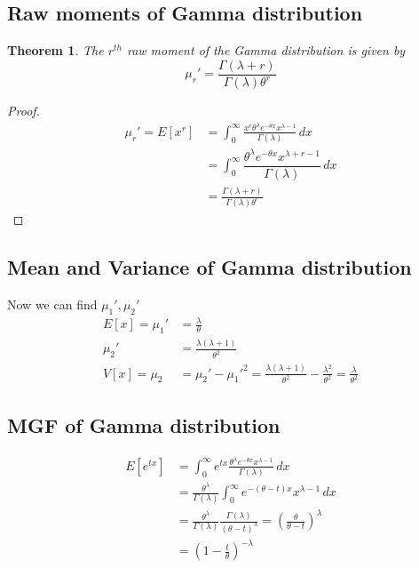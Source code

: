 \documentclass[oneside,11pt,pdftex]{book}%
\numberwithin{equation}{section}
\newtheorem{theorem}{Theorem}[chapter]%
\numberwithin{section}{chapter}
\numberwithin{equation}{chapter}
\begin{document}
\subsection{Raw moments of Gamma distribution}
\begin{theorem}
	The $ r^{th} $ raw moment of the Gamma distribution is given by \[\mu_r'=\frac{\Gamma(\lambda+r)}{\Gamma(\lambda)\theta^r} \]
\end{theorem}
\begin{proof}
	\begin{align*}
		\mu_r'=E[x^r]&=\int_0^\infty \frac{x^r \theta^\lambda e^{-\theta x} x^{\lambda -1}}{\Gamma(\lambda)}\, dx\\
		&=\int_0^{\infty} \dfrac{\theta^{\lambda} e^{-\theta x}x^{\lambda+r-1}  }{\Gamma(\lambda)}\, dx\\
		&= \frac{\Gamma(\lambda+r)}{\Gamma(\lambda) \theta^r}
	\end{align*}
\end{proof}

\subsection{Mean and Variance of Gamma distribution}
Now we can find $ \mu_1', \mu_2' $
\begin{align*}
	E[x]= \mu_1'&=\frac{\lambda}{\theta}\\
	\mu_2'&= \frac{\lambda(\lambda+1)}{\theta^2}\\
	V[x] = \mu_2 &=\mu_2'-\mu_1'^2=\frac{\lambda(\lambda +1)}{\theta^2}-\frac{\lambda^2}{\theta^2}=\frac{\lambda}{\theta^2}
\end{align*}

\subsection{MGF of Gamma distribution}
\begin{align*}
	 E[e^{tx}]&=\int_0^{\infty} e^{tx} \frac{\theta^\lambda e^{-\theta x} x^{\lambda -1}}{\Gamma(\lambda )}\, dx\\
	 &= \frac{\theta^{\lambda}}{\Gamma (\lambda)} \int_0^{\infty} e^{-(\theta - t) x}x^{\lambda -1}\, dx\\
	 &= \frac{\theta^\lambda}{\Gamma(\lambda )} \frac{\Gamma(\lambda )}{(\theta -t )^{\lambda}}=\left( \frac{\theta}{\theta - t}\right)^\lambda\\
	 &=\left(1- \frac{t}{\theta}\right)^{- \lambda}
\end{align*}
\end{document}
